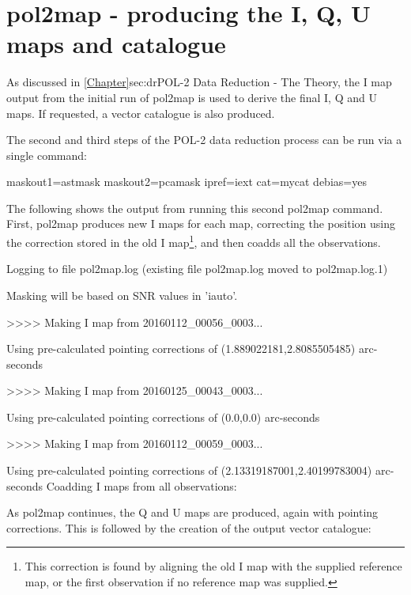 \section{pol2map - producing the I, Q, U maps and catalogue}


As discussed in \cref{Chapter}{sec:dr}{POL-2 Data Reduction - The
  Theory}, the I map output from the initial run of pol2map is used to
derive the final I, Q and U maps. If requested, a vector catalogue is
also produced.

The second and third steps of the POL-2 data reduction process can be
run via a single command:

\begin{terminalv}
          maskout1=astmask maskout2=pcamask ipref=iext cat=mycat debias=yes
\end{terminalv}

The following shows the output from running this second pol2map
command. First, pol2map produces new I maps for each map, correcting
the position using the correction stored in the old I
map\footnote{This correction is found by aligning the old I map with the
supplied reference map, or the first observation if no reference map was
supplied.}, and then coadds all the observations.

\begin{terminalv}
Logging to file pol2map.log
(existing file pol2map.log moved to pol2map.log.1)

Masking will be based on SNR values in 'iauto'.

>>>>   Making I map from 20160112_00056_0003...

   Using pre-calculated pointing corrections of (1.889022181,2.8085505485) arc-seconds

>>>>   Making I map from 20160125_00043_0003...

   Using pre-calculated pointing corrections of (0.0,0.0) arc-seconds

>>>>   Making I map from 20160112_00059_0003...

   Using pre-calculated pointing corrections of (2.13319187001,2.40199783004) arc-seconds
Coadding I maps from all observations:
\end{terminalv}

As pol2map continues, the Q and U maps are produced, again with
pointing corrections. This is followed by the creation of the output
vector catalogue:


